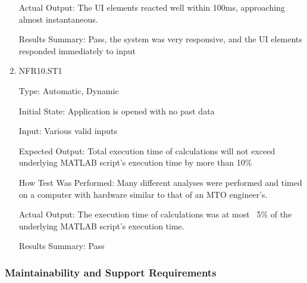 \documentclass[12pt, titlepage]{article}
\begin{document}
\begin{enumerate}
Actual Output: The UI elements reacted well within 100ms, approaching almost instantaneous.

Results Summary: Pass, the system was very responsive, and the UI elements responded immediately to input

\item{NFR10.ST1\\}

Type: Automatic, Dynamic

Initial State: Application is opened with no past data

Input: Various valid inputs

Expected Output: Total execution time of calculations will not exceed underlying MATLAB script's execution time by more than 10\%

How Test Was Performed: Many different analyses were performed and timed on a computer with hardware similar to that of an MTO engineer's.

Actual Output: The execution time of calculations was at most ~5\% of the underlying MATLAB script's execution time.

Results Summary: Pass

\end{enumerate}

\subsubsection{Maintainability and Support Requirements}
\end{document}

